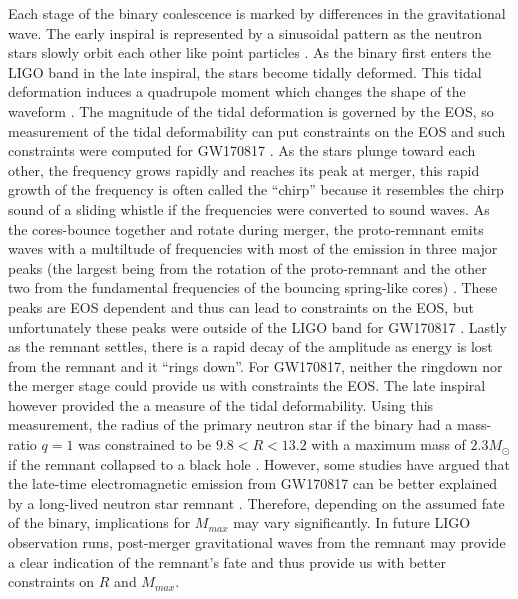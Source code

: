 Each stage of the binary coalescence is marked by differences in the gravitational wave. The early inspiral is represented by a sinusoidal pattern as the neutron stars slowly orbit each other like point particles \cite{bauswein2019spectral}. As the binary first enters the LIGO band in the late inspiral, the stars become tidally deformed. This tidal deformation induces a quadrupole moment which changes the shape of the waveform \cite{hinderer2010tidal}. The magnitude of the tidal deformation is governed by the EOS, so measurement of the tidal deformability can put constraints on the EOS and such constraints were computed for GW170817 \cite{raithel2019constraints}. As the stars plunge toward each other, the frequency grows rapidly and reaches its peak at merger, this rapid growth of the frequency is often called the ``chirp'' because it resembles the chirp sound of a sliding whistle if the frequencies were converted to sound waves. As the cores-bounce together and rotate during merger, the proto-remnant emits waves with a multiltude of frequencies with most of the emission in three major peaks (the largest being from the rotation of the proto-remnant and the other two from the fundamental frequencies of the bouncing spring-like cores) \cite{takami:2015}. These peaks are EOS dependent and thus can lead to constraints on the EOS, but unfortunately these peaks were outside of the LIGO band for GW170817 \cite{Abbott:2017dke}. Lastly as the remnant settles, there is a rapid decay of the amplitude as energy is lost from the remnant and it ``rings down''. For GW170817, neither the ringdown nor the merger stage could provide us with constraints the EOS. The late inspiral however provided the a measure of the tidal deformability. Using this measurement, the radius of the primary neutron star if the binary had a mass-ratio $q=1$ was constrained to be $9.8 < R < 13.2$ with a maximum mass of $2.3M_\odot$ if the remnant collapsed to a black hole \cite{raithel2019constraints}. However, some studies have argued that the late-time electromagnetic emission from GW170817 can be better explained by a long-lived neutron star remnant \cite{yu2018long}.  Therefore, depending on the assumed fate of the binary, implications for $M_{max}$ may vary significantly. In future LIGO observation runs, post-merger gravitational waves from the remnant may provide a clear indication of the remnant’s fate and thus provide us with better constraints on $R$ and $M_{max}$.

